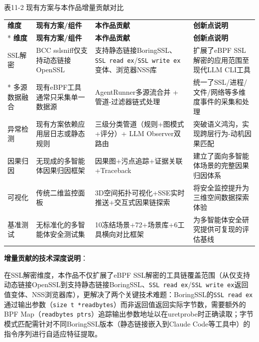 \documentclass[a4paper]{ctexart}
\makeatletter
\renewcommand{\_}{%
  \ifmmode
    \nfss@text{\textunderscore}%
  \else
    \textunderscore\discretionary{}{}{}%
  \fi}
\makeatother
\begin{document}
\medskip
{\centering\small
表11-2 现有方案与本作品增量贡献对比\par
\vspace{3pt}
\setlength{\tabcolsep}{6pt}
\renewcommand{\arraystretch}{1.1}
\begin{longtable}{p{4.3cm} >{\raggedright\arraybackslash}p{3.3cm} >{\raggedright\arraybackslash}p{3.3cm} >{\raggedright\arraybackslash}p{3.3cm}}
\hline
\textbf{维度} & \textbf{现有方案/组件} & \textbf{本作品贡献} & \textbf{创新点说明} \\*
\hline
\endfirsthead
\hline
\textbf{维度} & \textbf{现有方案/组件} & \textbf{本作品贡献} & \textbf{创新点说明} \\
\hline
\endhead
\hline
\endfoot
\hline
\endlastfoot
SSL解密 & BCC sslsniff仅支持动态链接OpenSSL & 支持静态链接BoringSSL、\texttt{SSL\_read\_ex}/\texttt{SSL\_write\_ex}变体、浏览器NSS库 & 扩展了eBPF SSL解密的应用范围至现代LLM CLI工具 \\*
\hline
多源数据融合 & 现有eBPF工具通常只采集单一数据源 & AgentRunner多源流合并 + 管道-过滤器链式处理 & 统一了SSL/进程/文件/网络等多维度事件的采集和处理 \\
\hline
异常检测 & 现有方案依赖应用层日志或静态规则 & 三级分类管道（规则+图模式+评分）+ LLM Observer双路由 & 突破语义鸿沟，实现跨层行为-动机因果匹配 \\
\hline
因果归因 & 无现成的多智能体因果归因框架 & 因果图+污点追踪+证据关联+Traceback & 建立了面向多智能体场景的完整因果归因体系 \\
\hline
可视化 & 传统二维监控面板 & 3D空间拓扑可视化+SSE实时推送+交互式因果链探索 & 将安全监控提升为三维空间数据探索体验 \\
\hline
基准测试 & 无标准化的多智能体安全测试集 & 10冻结场景+72+场景库+6工具横向对比框架 & 为多智能体安全研究提供可复现的评估基线 \\
\hline
\end{longtable}
\par}



\textbf{增量贡献的技术深度说明}：


在SSL解密维度，本作品不仅扩展了eBPF SSL解密的工具链覆盖范围（从仅支持动态链接OpenSSL到支持静态链接BoringSSL、\texttt{SSL\_read\_ex}/\texttt{SSL\_write\_ex}返回值变体、NSS浏览器库），更解决了两个关键技术难题：BoringSSL的\texttt{SSL\_read\_ex}通过输出参数（\texttt{size\_t *readbytes}）而非返回值返回实际字节数，需要额外的BPF Map（\texttt{readbytes\_ptrs}）追踪输出参数地址以在uretprobe时正确读取；字节模式匹配需针对不同BoringSSL版本（静态链接嵌入到Claude Code等工具中）的指令序列进行自适应特征提取。
\end{document}

